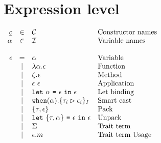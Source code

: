 \documentclass{article}[11pt]
\newcommand{\term}[1]{\verb~#1~}
\begin{document}
    \section{Expression level}\label{sec:expression-level}

    \begin{math}
        \begin{array}{rclp{5cm}}
            \underline{c} & \in  & {\cal C}                                                                     & Constructor names \\
            \alpha        & \in  & {\cal I}                                                                     & Variable names    \\
            \\
            \epsilon & =
            & \alpha                                                                         & Variable              \\
            & \mid & \lambda \alpha . \epsilon                                               & Function              \\
            & \mid & \zeta . \epsilon                                                        & Method              \\
            & \mid & \epsilon ~ \epsilon                                                     & Application              \\
            & \mid & \term{let}~\alpha ~ \term{=} ~ \epsilon ~ \term{in} ~ \epsilon          & Let~binding              \\
            & \mid & \term{when}(\alpha).\{ \tau_i \rhd \epsilon_i \}_I                      & Smart cast              \\
            & \mid & \{\tau, \epsilon\}                                                      & Pack              \\
            & \mid & \term{let} ~ \{\tau, \alpha\} ~ \term{=} ~ \epsilon ~\term{in}~\epsilon & Unpack              \\
            & \mid & \Sigma                                                                  & Trait~term              \\
            & \mid & \epsilon . m                                                            & Trait~term~Usage             \\
        \end{array} \\
    \end{math}
\end{document}
